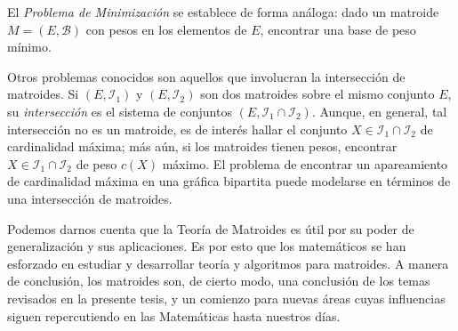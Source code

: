 El \textit{Problema de Minimización} se establece de forma análoga: dado un matroide $M=(E,\mathcal{B})$ con pesos en los elementos de $E$, encontrar una base de peso mínimo.

Otros problemas conocidos son aquellos que involucran la intersección de matroides. Si $(E,\mathcal{I}_{1})$ y $(E,\mathcal{I}_{2})$ son dos matroides sobre el mismo conjunto $E$, su \textit{intersección} es el sistema de conjuntos $(E,\mathcal{I}_{1} \cap \mathcal{I}_{2})$. Aunque, en general, tal intersección no es un matroide, es de interés hallar el conjunto $X \in \mathcal{I}_{1} \cap \mathcal{I}_{2} $ de cardinalidad máxima; más aún, si los matroides tienen pesos, encontrar $X \in \mathcal{I}_{1} \cap \mathcal{I}_{2}$ de peso $c(X)$ máximo. El problema de encontrar un apareamiento de cardinalidad máxima en una gráfica bipartita puede modelarse en términos de una intersección de matroides.

Podemos darnos cuenta que la Teoría de Matroides es útil por su poder de generalización y sus aplicaciones. Es por esto que los matemáticos se han esforzado en estudiar y desarrollar teoría y algoritmos para matroides. A manera de conclusión, los matroides son, de cierto modo, una conclusión de los temas revisados en la presente tesis, y un comienzo para nuevas áreas cuyas influencias siguen repercutiendo en las Matemáticas hasta nuestros días.